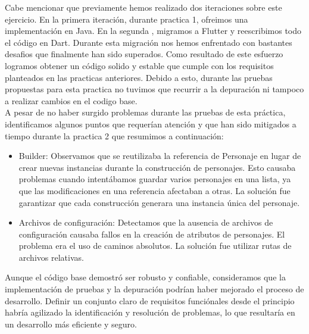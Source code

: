 \documentclass{article}
\begin{document}
Cabe mencionar que previamente hemos realizado dos iteraciones sobre este ejercicio. En la primera iteración, durante practica 1, ofreimos una implementación en Java. En la segunda , migramos a Flutter y reescribimos todo el código en Dart. Durante esta migración nos hemos enfrentado con bastantes desafios que finalmente han sido superados. Como resultado de este esfuerzo logramos obtener un código solido y estable que cumple con los requisitos planteados en las practicas anteriores. Debido a esto, durante las pruebas propuestas para esta practica no tuvimos que recurrir a la depuración ni tampoco a realizar cambios en el codigo base. \\


A pesar de no haber surgido problemas durante las pruebas de esta práctica, identificamos algunos puntos que requerían atención y que han sido mitigados a tiempo durante la practica 2 que resumimos a continuación:

\begin{itemize}
\item[\textbullet] Builder: Observamos que se reutilizaba la referencia de Personaje en lugar de crear nuevas instancias durante la construcción de personajes. Esto causaba problemas cuando intentábamos guardar varios personajes en una lista, ya que las modificaciones en una referencia afectaban a otras. La solución fue garantizar que cada construcción generara una instancia única del personaje.


\item[\textbullet] Archivos de configuración: Detectamos que la ausencia de archivos de configuración causaba fallos en la creación de atributos de personajes. El problema era el uso de caminos absolutos. La solución fue utilizar rutas de archivos relativas. 

\end{itemize}


Aunque el código base demostró ser robusto y confiable, consideramos que la implementación de pruebas y la depuración podrían haber mejorado el proceso de desarrollo. Definir un conjunto claro de requisitos funciónales desde el principio habría agilizado la identificación y resolución de problemas, lo que resultaría en un desarrollo más eficiente y seguro. 
\end{document}
